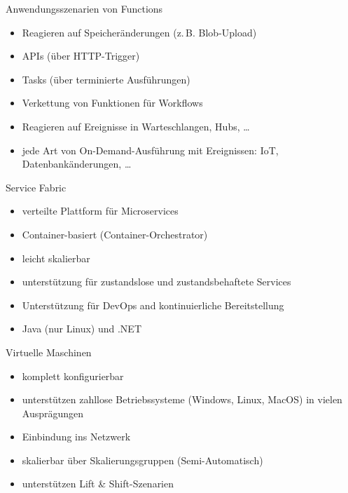 \begin{flashcard}[]{Anwendungsszenarien von Functions}
  \begin{itemize}
    \item Reagieren auf Speicheränderungen (z.\,B. Blob-Upload)
    \item APIs (über HTTP-Trigger)
    \item Tasks (über terminierte Ausführungen)
    \item Verkettung von Funktionen für Workflows
    \item Reagieren auf Ereignisse in Warteschlangen, Hubs, \ldots
    \item jede Art von On-Demand-Ausführung mit Ereignissen: IoT, Datenbankänderungen, \ldots
  \end{itemize}
\end{flashcard}

\begin{flashcard}[]{Service Fabric}
  \begin{itemize}
    \item verteilte Plattform für Microservices
    \item Container-basiert (Container-Orchestrator)
    \item leicht skalierbar
    \item unterstützung für zustandslose und zustandsbehaftete Services
    \item Unterstützung für DevOps and kontinuierliche Bereitstellung
    \item Java (nur Linux) und .NET
  \end{itemize}
\end{flashcard}

\begin{flashcard}[]{Virtuelle Maschinen}
  \begin{itemize}
    \item komplett konfigurierbar
    \item unterstützen zahllose Betriebssysteme (Windows, Linux, MacOS) in vielen Ausprägungen
    \item Einbindung ins Netzwerk
    \item skalierbar über Skalierungsgruppen (Semi-Automatisch)
    \item unterstützen Lift \& Shift-Szenarien
  \end{itemize}
\end{flashcard}

